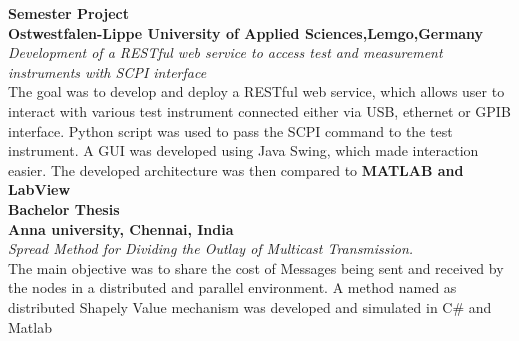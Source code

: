 \documentclass[11.9pt]{xetexCV}
\begin{document}
\textbf{{\color{bluesubheading}Semester Project}}  \\
\vspace{1.5mm}%
\textbf{{\color{bluesubheading}Ostwestfalen-Lippe University  of Applied Sciences,Lemgo,Germany}}\\
\textit{{\color{bluesubheading}Development of a RESTful web service to access test and
measurement instruments with SCPI interface}}\\[1.5mm]
The goal was to develop and deploy a RESTful web service, which allows user to interact with various test instrument connected either via USB, ethernet or GPIB interface. Python script was used to pass the SCPI command to the test instrument.  A GUI was developed using Java Swing, which made interaction easier. The developed architecture was then compared to \textbf{MATLAB and LabView} \\

\textbf{{\color{bluesubheading}Bachelor Thesis}}  \\
\vspace{1.5mm}%
\textbf{{\color{bluesubheading}Anna university, Chennai, India}}\\
\textit{{\color{bluesubheading}Spread  Method  for Dividing the Outlay  of Multicast Transmission.}}\\[1.5mm]
The main objective was to share the cost of Messages being sent and received by the nodes in a distributed and parallel  environment. A method named as distributed Shapely Value mechanism was developed and simulated in C\# and Matlab\\
\end{document}
